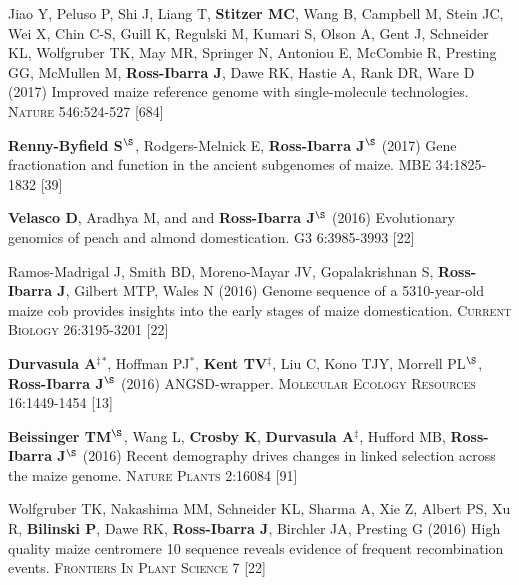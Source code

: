 \documentclass[letterpaper,10pt]{article}
\begin{document}
\begin{etaremune}
\item  Jiao Y, Peluso P,  Shi J,  Liang T, {\bf Stitzer MC}, Wang B,  Campbell M, Stein JC,  Wei X,  Chin C-S,  Guill K,  Regulski M,  Kumari S,  Olson A,  Gent J, Schneider KL,  Wolfgruber TK, May MR, Springer N,  Antoniou E,  McCombie R, Presting GG,  McMullen M, {\bf Ross-Ibarra J}, Dawe RK,  Hastie A, Rank DR, Ware D (2017) Improved maize reference genome with single-molecule technologies. \textsc{Nature}  546:524-527
 [684]\\

\item  {\bf Renny-Byfield S}$^\S$, Rodgers-Melnick E, {\bf Ross-Ibarra J}$^\S$ (2017) Gene fractionation and function in the ancient subgenomes of maize. \textsc{MBE} 34:1825-1832
 [39]\\

\item {\bf Velasco D}, Aradhya M, and  and {\bf Ross-Ibarra J}$^\S$ (2016) Evolutionary genomics of peach and almond domestication. \textsc{G3} 6:3985-3993
 [22]\\

\item Ramos-Madrigal J, Smith BD, Moreno-Mayar JV, Gopalakrishnan S, {\bf Ross-Ibarra J}, Gilbert MTP, Wales N (2016) Genome sequence of a 5310-year-old maize cob provides insights into the early stages of maize domestication. \textsc{Current Biology} 26:3195-3201
 [22]\\

\item {\bf Durvasula A}$^\ddagger$$^*$,  Hoffman PJ$^*$, {\bf Kent TV}$^\ddagger$, Liu C, Kono TJY, Morrell PL$^\S$, {\bf Ross-Ibarra J}$^\S$ (2016) ANGSD-wrapper. \textsc{Molecular Ecology Resources} 16:1449-1454
 [13]\\

\item {\bf Beissinger TM}$^\S$, Wang L, {\bf Crosby K}, {\bf Durvasula A}$^\ddagger$, Hufford MB, {\bf Ross-Ibarra J}$^\S$ (2016)  Recent demography drives changes in linked selection across the maize genome. \textsc{Nature Plants} 2:16084
 [91]\\

\item Wolfgruber TK, Nakashima MM, Schneider KL, Sharma A, Xie Z, Albert PS, Xu R, {\bf Bilinski P},  Dawe RK, {\bf Ross-Ibarra J}, Birchler JA, Presting G (2016) High quality maize centromere 10 sequence reveals evidence of frequent recombination events. \textsc{Frontiers In Plant Science} 7
 [22]\\


\end{etaremune}
\end{document}
